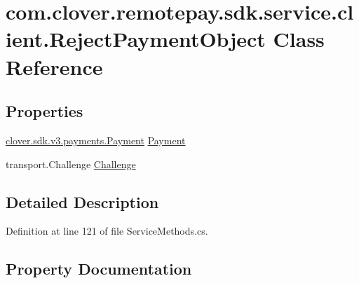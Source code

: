 \hypertarget{classcom_1_1clover_1_1remotepay_1_1sdk_1_1service_1_1client_1_1_reject_payment_object}{}\section{com.\+clover.\+remotepay.\+sdk.\+service.\+client.\+Reject\+Payment\+Object Class Reference}
\label{classcom_1_1clover_1_1remotepay_1_1sdk_1_1service_1_1client_1_1_reject_payment_object}
\subsection*{Properties}
\begin{DoxyCompactItemize}
\item 
\hyperlink{classcom_1_1clover_1_1sdk_1_1v3_1_1payments_1_1_payment}{clover.\+sdk.\+v3.\+payments.\+Payment} \hyperlink{classcom_1_1clover_1_1remotepay_1_1sdk_1_1service_1_1client_1_1_reject_payment_object_a8813cea081471ac9b4f034372241f219}{Payment}
\item 
transport.\+Challenge \hyperlink{classcom_1_1clover_1_1remotepay_1_1sdk_1_1service_1_1client_1_1_reject_payment_object_a2126578f945e02f490d72dd92845db3e}{Challenge}
\end{DoxyCompactItemize}


\subsection{Detailed Description}


Definition at line 121 of file Service\+Methods.\+cs.



\subsection{Property Documentation}
\mbox{\label{classcom_1_1clover_1_1remotepay_1_1sdk_1_1service_1_1client_1_1_reject_payment_object_a2126578f945e02f490d72dd92845db3e}} 
